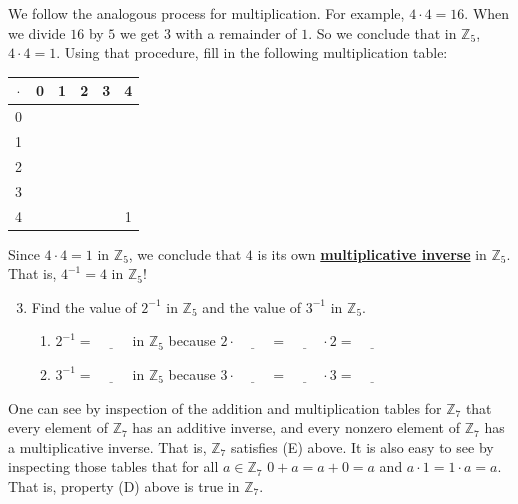 \documentclass[11pt]{article}
\renewcommand\emph[1]{\underline{\bf{#1}}} %
\theoremstyle{definition}
\begin{document}
  We follow the analogous process for multiplication. For example, $4 \cdot 4 = 16$. When we divide $16$ by $5$ we get $3$ with a remainder of $1$. So we
  conclude that in $\mathbb{Z}_5$, $4 \cdot 4 = 1$. Using that procedure, fill in the following multiplication table:

  \begin{center}
    \begin{tabular}{|c|c|c|c|c|c|}\\ \hline
      $\cdot$ & 0 & 1 & 2 & 3 & 4 \\ \hline
      0   &   &   &   &   &   \\ \hline
      1   &   &   &   &   &   \\ \hline
      2   &   &   &   &   &   \\ \hline
      3   &   &   &   &   &   \\ \hline
      4   &   &   &   &   & 1 \\ \hline
    \end{tabular}
  \end{center}

  Since $4\cdot 4 = 1$ in $\mathbb{Z}_5$, we conclude that $4$ is its own \emph{multiplicative inverse} in $\mathbb{Z}_5$. That is, $4^{-1}=4$ in $\mathbb{Z}_5$!

    \begin{enumerate}
        \setcounter{enumi}{2}
      \item Find the value of $2^{-1}$ in $\mathbb{Z}_5$ and the value of $3^{-1}$ in $\mathbb{Z}_5$. 
        \begin{enumerate}
          \item $2^{-1}=\underline{\hspace{1cm}}$ in $\mathbb{Z}_5$ because $2\cdot \underline{\hspace{1cm}} = \underline{\hspace{1cm}}\cdot 2 = \underline{\hspace{1cm}}$
          \item $3^{-1}=\underline{\hspace{1cm}}$ in $\mathbb{Z}_5$ because $3\cdot \underline{\hspace{1cm}} = \underline{\hspace{1cm}}\cdot 3 = \underline{\hspace{1cm}}$
        \end{enumerate}
    \end{enumerate}

    One can see by inspection of the addition and multiplication tables for $\mathbb{Z}_7$ that every element of $\mathbb{Z}_7$ has an additive inverse, and
    every nonzero element of $\mathbb{Z}_7$ has a multiplicative inverse. That is, $\mathbb{Z}_7$ satisfies (E) above. It is also easy to see by 
    inspecting those tables that for all $a\in \mathbb{Z}_7$ $0+a=a+0 = a$ and $a\cdot 1 = 1 \cdot a = a$. That is, property (D) above is true 
    in $\mathbb{Z}_7$. 
\end{document}
